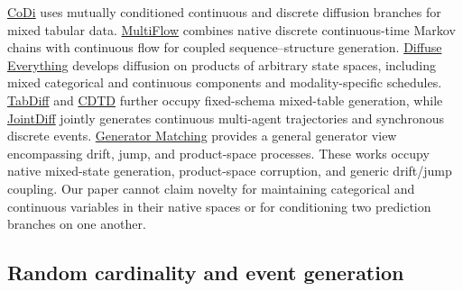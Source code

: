 \documentclass[11pt]{article}
\begin{document}
\href{https://proceedings.mlr.press/v202/lee23i.html}{CoDi} uses mutually conditioned continuous and discrete diffusion branches for mixed tabular data. \href{https://proceedings.mlr.press/v235/campbell24a.html}{MultiFlow} combines native discrete continuous-time Markov chains with continuous flow for coupled sequence--structure generation. \href{https://openreview.net/forum?id=AjbiIcRt6q}{Diffuse Everything} develops diffusion on products of arbitrary state spaces, including mixed categorical and continuous components and modality-specific schedules. \href{https://openreview.net/forum?id=152c06fde5afb804fa5e2d50486a172bd56ec4e6}{TabDiff} and \href{https://openreview.net/forum?id=QPtoBPn4lZ}{CDTD} further occupy fixed-schema mixed-table generation, while \href{https://openreview.net/forum?id=6jThckejtL}{JointDiff} jointly generates continuous multi-agent trajectories and synchronous discrete events. \href{https://proceedings.iclr.cc/paper_files/paper/2025/hash/819aaee144cb40e887a4aa9e781b1547-Abstract-Conference.html}{Generator Matching} provides a general generator view encompassing drift, jump, and product-space processes. These works occupy native mixed-state generation, product-space corruption, and generic drift/\allowbreak{}jump coupling. Our paper cannot claim novelty for maintaining categorical and continuous variables in their native spaces or for conditioning two prediction branches on one another.

\subsection{Random cardinality and event generation}
\label{sec:random-cardinality-and-event-generation}
\end{document}
